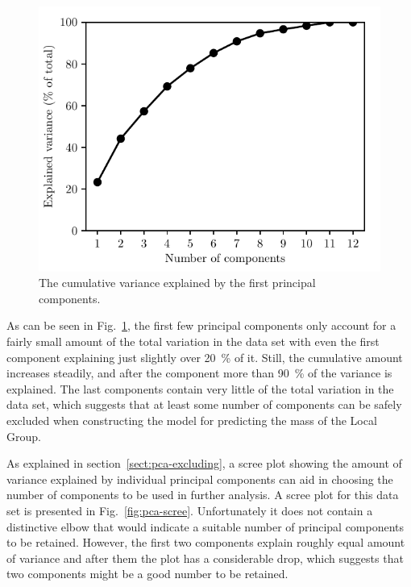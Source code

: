 \documentclass[english, twoside]{HYgradu}
\begin{document}
\begin{figure}
    \centering
    \includegraphics{kuvat/PCA/cumulative_variances.pdf}
    \caption{The cumulative variance explained by the first principal components.}\label{fig:pca-cumulative-variance}
\end{figure}

As can be seen in Fig.~\ref{fig:pca-cumulative-variance}, the first few principal components only account for a fairly small amount of the total variation in the data set with even the first component explaining just slightly over 20~\% of it. Still, the cumulative amount increases steadily, and after the  component more than 90~\% of the variance is explained. The last components contain very little of the total variation in the data set, which suggests that at least some number of components can be safely excluded when constructing the model for predicting the mass of the Local Group.

As explained in section~\ref{sect:pca-excluding}, a scree plot showing the amount of variance explained by individual principal components can aid in choosing the number of components to be used in further analysis. A scree plot for this data set is presented in Fig.~\ref{fig:pca-scree}. Unfortunately it does not contain a distinctive elbow that would indicate a suitable number of principal components to be retained. However, the first two components explain roughly equal amount of variance and after them the plot has a considerable drop, which suggests that two components might be a good number to be retained.  
\end{document}

